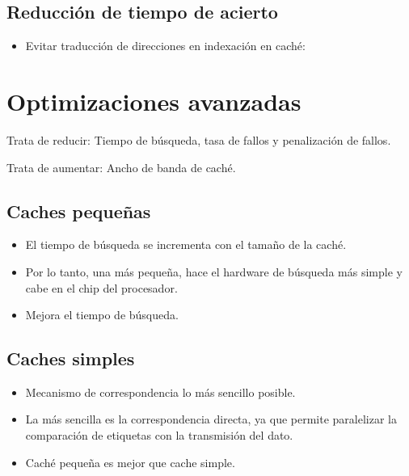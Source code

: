 \documentclass[12pt, twoside, openright]{report} %
\begin{document}
 \subsection{Reducción de tiempo de acierto}

  \begin{itemize}
  
  \item
    Evitar traducción de direcciones en indexación en caché:
  \end{itemize}

  \section{Optimizaciones avanzadas}

    Trata de reducir: Tiempo de búsqueda, tasa de fallos y penalización
    de fallos.

    Trata de aumentar: Ancho de banda de caché.

   \subsection{Caches pequeñas}

    \begin{itemize}
    
    \item
      El tiempo de búsqueda se incrementa con el tamaño de la caché.
    \item
      Por lo tanto, una más pequeña, hace el hardware de búsqueda más
      simple y cabe en el chip del procesador.
    \item
      Mejora el tiempo de búsqueda.
    \end{itemize}

    \subsection{Caches simples}

    \begin{itemize}
    
    \item
      Mecanismo de correspondencia lo más sencillo posible.
    \item
      La más sencilla es la correspondencia directa, ya que permite
      paralelizar la comparación de etiquetas con la transmisión del
      dato.
    \item
      Caché pequeña es mejor que cache simple.
    \end{itemize}
\end{document}
